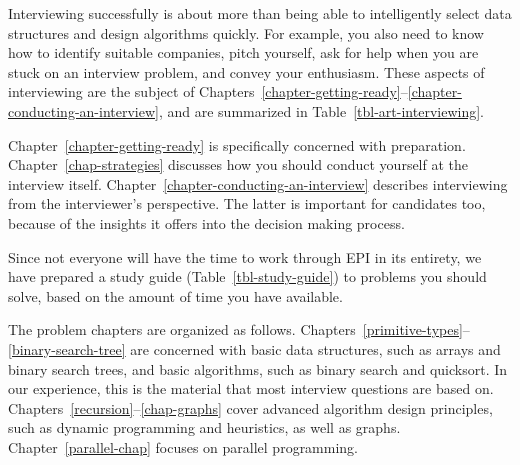 \documentclass[10pt,openany,twoside,letterpaper,extrafontsizes]{memoir}
\newcommand{\myindex}[1]{%
\index[terms]{#1}%
}
\begin{document}
\begin{Spacing}{\introSpacing}

\noindent
Interviewing successfully is about more than being able to intelligently
select data structures and design algorithms quickly.
For example, you also need to know how to identify suitable companies, pitch yourself,
ask for help when you are stuck on an interview problem, and convey your enthusiasm.
These aspects of interviewing are the subject of
Chapters~\ref{chapter-getting-ready}--\ref{chapter-conducting-an-interview}, and are
summarized in Table~\vref{tbl-art-interviewing}.

Chapter~\ref{chapter-getting-ready} is specifically concerned with
preparation. Chapter~\ref{chap-strategies} discusses how you
should conduct yourself at the interview itself. Chapter~\ref{chapter-conducting-an-interview}
describes interviewing from the interviewer's perspective. The latter
is important for candidates too, because of the insights it offers into the
decision making process.

Since not everyone will have the time to work through EPI in its entirety,
we have prepared a study guide (Table~\vref{tbl-study-guide}) to problems you
should solve, based on the amount of time you have available.

The problem chapters are organized as follows.
Chapters~\ref{primitive-types}--\ref{binary-search-tree} are concerned with basic data structures, such as \myindex{array}arrays
and \myindex{BST}binary search trees, and basic algorithms, such as \myindex{binary search}binary search and \myindex{quicksort}quicksort. In our experience, this is the material
that most interview questions are based on.
Chapters~\ref{recursion}--\ref{chap-graphs}
cover advanced algorithm design principles, such as
\myindex{DP}dynamic programming and heuristics, as
well as graphs. Chapter~\ref{parallel-chap} focuses on parallel
programming.


\end{Spacing}
\end{document}
